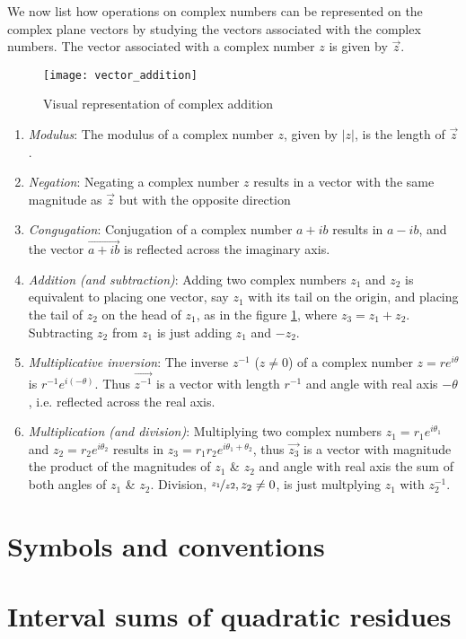\documentclass{report}
\begin{document}
We now list how operations on complex numbers can be represented on the complex plane vectors by studying the vectors associated with the complex numbers. The vector associated with a complex number $z$ is given by $\vec{z}$.
\begin{figure}
\texttt{[image: vector\_addition]}
\centering
\caption{Visual representation of complex addition}
\label{fig:vector_addition}
\end{figure}
%
\begin{enumerate}
    \item \textit{Modulus}: The modulus of a complex number $z$, given by $\lvert z\rvert$, is the length of $\vec{z}$.
    \item \textit{Negation}: Negating a complex number $z$ results in a vector with the same magnitude as $\vec{z}$ but with the opposite direction
    \item \textit{Congugation}: Conjugation of a complex number $a+ib$ results in $a-ib$, and the vector $\vec{a+ib}$ is reflected across the imaginary axis.
    \item \textit{Addition (and subtraction)}: Adding two complex numbers $z_1$ and $z_2$ is equivalent to placing one vector, say $z_1$ with its tail on the origin, and placing the tail of $z_2$ on the head of $z_1$, as in the figure \ref{fig:vector_addition}, where $z_3 = z_1+z_2$. Subtracting $z_2$ from $z_1$ is just adding $z_1$ and $-z_2$.
    \item \textit{Multiplicative inversion}: The inverse $z^{-1}$ ($z\neq 0$) of a complex number $z=re^{i\theta}$ is $r^{-1}e^{i(-\theta)}$. Thus $\vec{z^{-1}}$ is a vector with length $r^{-1}$ and angle with real axis $-\theta$, i.e. reflected across the real axis.
    \item \textit{Multiplication (and division)}: Multiplying two complex numbers $z_1=r_1e^{i\theta_1}$ and $z_2=r_2e^{i\theta_2}$ results in $z_3=r_1r_2e^{i{\theta_1+\theta_2}}$, thus $\vec{z_3}$ is a vector with magnitude the product of the magnitudes of $z_1$ \& $z_2$ and angle with real axis the sum of both angles of  $z_1$ \& $z_2$. Division, $\nicefrac{z_1}{z2},z_2\neq 0$, is just multplying $z_1$ with $z_2^{-1}$.
\end{enumerate}


%
%
\section{Symbols and conventions}
%
%
\section{Interval sums of quadratic residues}
%
\end{document}
